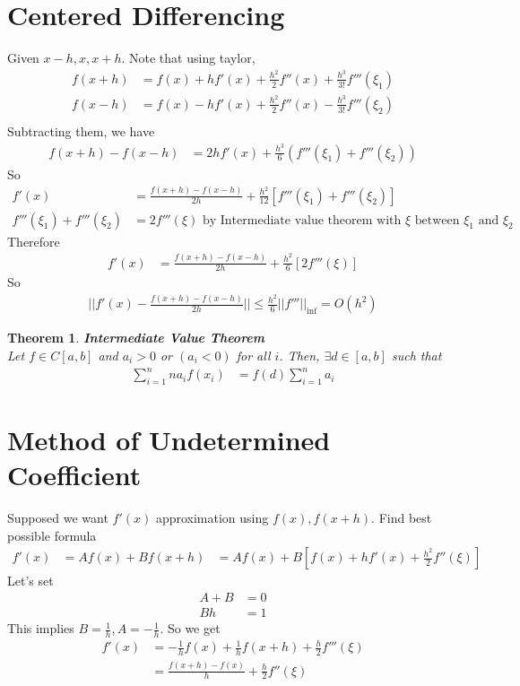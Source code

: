 \documentclass[11pt,oneside]{book}
\theoremstyle{break}
\theoremstyle{break}
\newtheorem{thm}{Theorem}[section]
\begin{document}
\section[Centered Differencing]{Centered Differencing}
Given $x-h,x,x+h$.
Note that using taylor, \begin{align*}
f(x+h)&=f(x)+hf'(x)+\frac{h^2}{2}f''(x)+\frac{h^3}{3!}f'''(\xi_1)\\
f(x-h)&=f(x)-hf'(x)+\frac{h^2}{2}f''(x)-\frac{h^3}{3!}f'''(\xi_2)\\
\end{align*}
Subtracting them, we have \begin{align*}
f(x+h)-f(x-h)&=2hf'(x)+\frac{h^3}{6}(f'''(\xi_1)+f'''(\xi_2))
\end{align*}
So \begin{align*}
f'(x)&=\frac{f(x+h)-f(x-h)}{2h}+\frac{h^2}{12}[f'''(\xi_1)+f'''(\xi_2)] \\
f'''(\xi_1)+f'''(\xi_2)&=2f'''(\xi) \text{ by Intermediate value theorem with $\xi$ between $\xi_1$ and $\xi_2$}
\end{align*}
Therefore \begin{align*}
f'(x)&=\frac{f(x+h)-f(x-h)}{2h}+\frac{h^2}{6}[2f'''(\xi)]
\end{align*}
So \begin{align*}
||f'(x)-\frac{f(x+h)-f(x-h)}{2h}||\leq \frac{h^2}{6}||f'''||_{\inf}=O(h^2)
\end{align*}
\begin{thm}
\textbf{Intermediate Value Theorem}\\
Let $f\in C[a,b]$ and $a_i>0$ or $(a_i<0)$ for all $i$. Then, $\exists d\in [a,b]$ such that \begin{align*}
\sum_{i=1}^nn a_if(x_i)&=f(d)\sum_{i=1}^na_i
\end{align*}
\end{thm}
\section[Method of Undetermined Coefficient]{Method of Undetermined Coefficient}
Supposed we want $f'(x)$ approximation using $f(x),f(x+h)$. Find best possible formula
\begin{align*}
f'(x)&=Af(x)+Bf(x+h)
&=Af(x)+B[f(x)+hf'(x)+\frac{h^2}{2}f''(\xi)]
\end{align*}
Let's set \begin{align*}
A+B&=0\\
Bh&=1
\end{align*}
This implies $B=\frac{1}{h},A=-\frac{1}{h}$. So we get \begin{align*}
f'(x)&=-\frac{1}{h}f(x)+\frac{1}{h}f(x+h)+\frac{h}{2}f'''(\xi)\\
&=\frac{f(x+h)-f(x)}{h}+\frac{h}{2}f''(\xi)
\end{align*}
\end{document}
